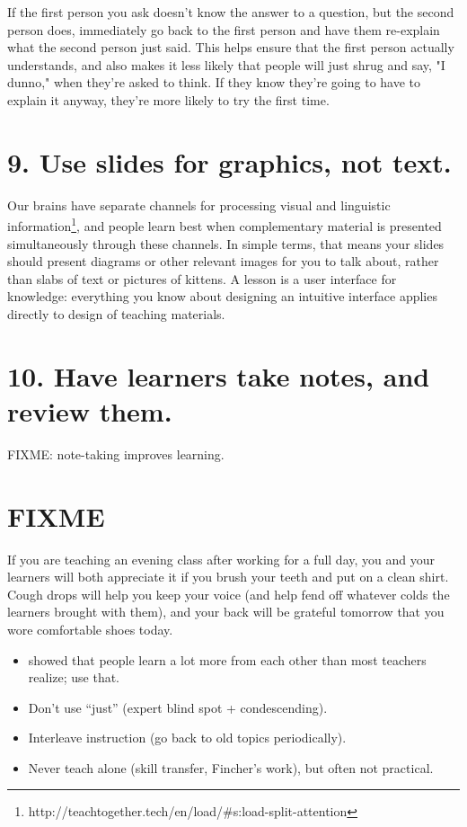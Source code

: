 \documentclass[10pt,letterpaper]{article}
\newcommand{\rulemajor}[1]{\section{#1}}
\begin{document}
If the first person you ask doesn't know the answer to a question,
but the second person does,
immediately go back to the first person and have them re-explain
what the second person just said.
This helps ensure that the first person actually understands,
and also makes it less likely that people will just shrug and say, "I dunno," when they're asked to think.
If they know they're going to have to explain it anyway,
they're more likely to try the first time.

\rulemajor{9. Use slides for graphics, not text.}

Our brains have separate channels for
processing visual and linguistic information\footnote{http://teachtogether.tech/en/load/\#s:load-split-attention},
and people learn best when complementary material is presented simultaneously through these channels.
In simple terms,
that means your slides should present diagrams or other relevant images for you to talk about,
rather than slabs of text or pictures of kittens.
A lesson is a user interface for knowledge:
everything you know about designing an intuitive interface applies directly to design of teaching materials.

\rulemajor{10. Have learners take notes, and review them.}

FIXME: note-taking improves learning.

\section*{FIXME}

If you are teaching an evening class after working for a full day,
you and your learners will both appreciate it if you brush your teeth and put on a clean shirt.
Cough drops will help you keep your voice (and help fend off whatever colds the learners brought with them),
and your back will be grateful tomorrow that you wore comfortable shoes today.

\begin{itemize}

\item \cite{Nuth2007} showed that people learn a lot more from each other
  than most teachers realize; use that.

\item Don't use ``just'' (expert blind spot + condescending).

\item Interleave instruction (go back to old topics periodically).

\item Never teach alone (skill transfer, Fincher's work), but often not practical.

\end{itemize}

\cite{Ambr2010}
\cite{Hust2012}
\cite{Lang2016}
\cite{Lemo2014}
\cite{Majo2015}
\cite{Maye2003}
\cite{Maye2009}
\cite{Mill1956}
\cite{Nuth2007}
\cite{Rice2018}
\cite{Wein2018a}
\cite{Wein2018b}
\cite{Wlod2017}


\end{document}
